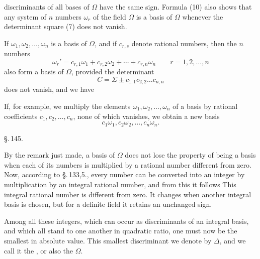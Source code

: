 discriminants of all bases of $\Omega$ have the same sign. Formula (10) also shows that any system of $n$ numbers $\omega_r$ of the field $\Omega$ is a basis of $\Omega$ whenever the determinant square (7) does not vanish.

If $\omega_1, \omega_2, \ldots, \omega_n$ is a basis of $\Omega$, and if $c_{r,s}$ denote rational numbers, then the $n$ numbers
\[
\omega_r' = c_{r,1}\omega_1 + c_{r,2}\omega_2 + \cdots + c_{r,n}\omega_n \qquad r = 1, 2, \ldots, n
\]
also form a basis of $\Omega$, provided the determinant
\[
C = \Sigma \pm c_{1,1}c_{2,2} \ldots c_{n,n}
\]
does not vanish, and we have

If, for example, we multiply the elements $\omega_1, \omega_2, \ldots, \omega_n$ of a basis by rational coefficients $c_1, c_2, \ldots, c_n$, none of which vanishes, we obtain a new basis
\[
c_1\omega_1, c_2\omega_2, \ldots, c_n\omega_n.
\]

\begin{center}
\S.\,145.

\end{center}

By the remark just made, a basis of $\Omega$ does not lose the property of being a basis when each of its numbers is multiplied by a rational number different from zero. Now, according to \S.\,133,5., every number can be converted into an integer by multiplication by an integral rational number, and from this it follows  This integral rational number is different from zero. It changes when another integral basis is chosen, but for a definite field it retains an unchanged sign.

Among all these integers, which can occur as discriminants of an integral basis, and which all stand to one another in quadratic ratio, one must now be the smallest in absolute value. This smallest discriminant we denote by $\varDelta$, and we call it the , or also the  $\Omega$.
